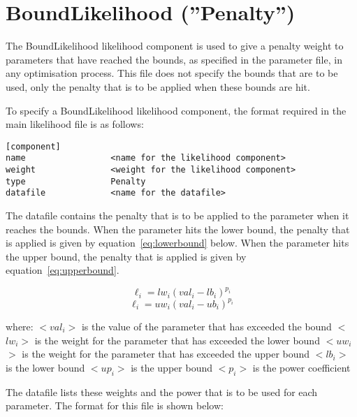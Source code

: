 \documentclass [a4paper, 10pt]{book}
\begin{document}
\section{BoundLikelihood (''Penalty'')}\label{sec:boundlike}
The BoundLikelihood likelihood component is used to give a penalty weight to parameters that have reached the bounds, as specified in the parameter file, in any optimisation process.  This file does not specify the bounds that are to be used, only the penalty that is to be applied when these bounds are hit.

\bigskip
To specify a BoundLikelihood likelihood component, the format required in the main likelihood file is as follows:

\begin{verbatim}
[component]
name                 <name for the likelihood component>
weight               <weight for the likelihood component>
type                 Penalty
datafile             <name for the datafile>
\end{verbatim}

The datafile contains the penalty that is to be applied to the parameter when it reaches the bounds.  When the parameter hits the lower bound, the penalty that is applied is given by equation~\ref{eq:lowerbound} below.  When the parameter hits the upper bound, the penalty that is applied is given by equation~\ref{eq:upperbound}.

\begin{equation}\label{eq:lowerbound}
\ell_{i} = lw_{i} (val_{i} - lb_{i})^{p_{i}}
\end{equation}
\begin{equation}\label{eq:upperbound}
\ell_{i} = uw_{i} (val_{i} - ub_{i})^{p_{i}}
\end{equation}

where:\newline
$<$$val_i$$>$ is the value of the parameter that has exceeded the bound\newline
$<$$lw_i$$>$ is the weight for the parameter that has exceeded the lower bound\newline
$<$$uw_i$$>$ is the weight for the parameter that has exceeded the upper bound\newline
$<$$lb_i$$>$ is the lower bound\newline
$<$$up_i$$>$ is the upper bound\newline
$<$$p_i$$>$ is the power coefficient 

\bigskip
The datafile lists these weights and the power that is to be used for each parameter.  The format for this file is shown below:
\end{document}
